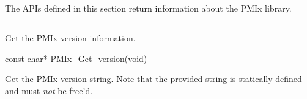 The \acp{API} defined in this section return information about the \ac{PMIx} library.

\subsection{}

\summary

Get the \ac{PMIx} version information.

\format

\cspecificstart
\begin{codepar}
const char* PMIx_Get_version(void)
\end{codepar}
\cspecificend

\descr

Get the \ac{PMIx} version string.
Note that the provided string is statically defined and must \textit{not} be free'd.


